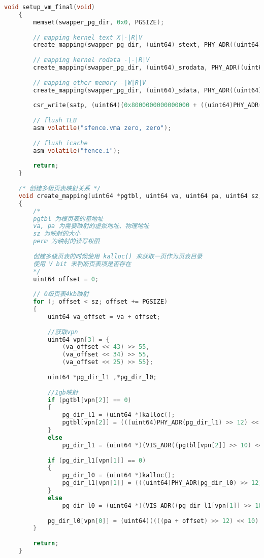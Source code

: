 \documentclass{source/Report}
\begin{document}
\begin{lstlisting}[language = c, title = {setup\_vm\_final}]
    void setup_vm_final(void)
    {
        memset(swapper_pg_dir, 0x0, PGSIZE);
    
        // mapping kernel text X|-|R|V
        create_mapping(swapper_pg_dir, (uint64)_stext, PHY_ADR((uint64)_stext), (uint64)_etext - (uint64)_stext, (uint64)0b0000001011);
    
        // mapping kernel rodata -|-|R|V
        create_mapping(swapper_pg_dir, (uint64)_srodata, PHY_ADR((uint64)_srodata), (uint64)_erodata - (uint64)_srodata, (uint64)0b0000000011);
    
        // mapping other memory -|W|R|V
        create_mapping(swapper_pg_dir, (uint64)_sdata, PHY_ADR((uint64)_sdata), (uint64)VM_KERNEL_END - (uint64)_sdata, (uint64)0b0000000111);
    
        csr_write(satp, (uint64)(0x8000000000000000 + ((uint64)PHY_ADR(swapper_pg_dir) >> 12)));
    
        // flush TLB
        asm volatile("sfence.vma zero, zero");
    
        // flush icache
        asm volatile("fence.i");
    
        return;
    }
    
    /* 创建多级页表映射关系 */
    void create_mapping(uint64 *pgtbl, uint64 va, uint64 pa, uint64 sz, uint64 perm)
    {
        /*
        pgtbl 为根页表的基地址
        va, pa 为需要映射的虚拟地址、物理地址
        sz 为映射的大小
        perm 为映射的读写权限
    
        创建多级页表的时候使用 kalloc() 来获取一页作为页表目录
        使用 V bit 来判断页表项是否存在
        */
        uint64 offset = 0;
    
        // 0级页表4kb映射
        for (; offset < sz; offset += PGSIZE)
        {
            uint64 va_offset = va + offset;
    
            //获取vpn
            uint64 vpn[3] = {
                (va_offset << 43) >> 55,
                (va_offset << 34) >> 55,
                (va_offset << 25) >> 55};
    
            uint64 *pg_dir_l1 ,*pg_dir_l0;
    
            //1gb映射
            if (pgtbl[vpn[2]] == 0)
            {
                pg_dir_l1 = (uint64 *)kalloc();
                pgtbl[vpn[2]] = (((uint64)PHY_ADR(pg_dir_l1) >> 12) << 10) + NOT_LEAF_PERM;
            }
            else
                pg_dir_l1 = (uint64 *)(VIS_ADR((pgtbl[vpn[2]] >> 10) << 12));
    
            if (pg_dir_l1[vpn[1]] == 0)
            {
                pg_dir_l0 = (uint64 *)kalloc();
                pg_dir_l1[vpn[1]] = (((uint64)PHY_ADR(pg_dir_l0) >> 12) << 10) + NOT_LEAF_PERM;
            }
            else
                pg_dir_l0 = (uint64 *)(VIS_ADR((pg_dir_l1[vpn[1]] >> 10) << 12));
    
            pg_dir_l0[vpn[0]] = (uint64)((((pa + offset) >> 12) << 10) + perm);
        }
    
        return;
    }
\end{lstlisting}
\end{document}
